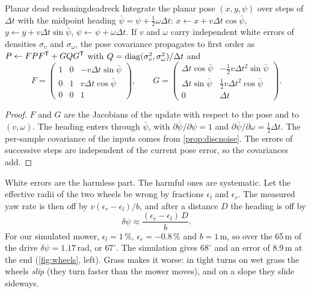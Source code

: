 \begin{proposition}{Planar dead reckoning}{deadreck}
Integrate the planar pose $(x,y,\psi)$ over steps of $\Delta t$ with the
midpoint heading $\bar\psi=\psi+\frac12\omega\Delta t$:
$x\leftarrow x+v\Delta t\cos\bar\psi$, $y\leftarrow y+v\Delta t\sin\bar\psi$,
$\psi\leftarrow\psi+\omega\Delta t$. If $v$ and $\omega$ carry independent
white errors of densities $\sigma_v$ and $\sigma_\omega$, the pose
covariance propagates to first order as $P\leftarrow FPF^{\mathsf{T}}+GQG^{\mathsf{T}}$ with
$Q=\operatorname{diag}(\sigma_v^2,\sigma_\omega^2)/\Delta t$ and
\begin{equation}\label{eq:odocov}
F=\begin{pmatrix}1&0&-v\Delta t\sin\bar\psi\\0&1&v\Delta t\cos\bar\psi\\
0&0&1\end{pmatrix},\qquad
G=\begin{pmatrix}\Delta t\cos\bar\psi&-\frac12v\Delta t^2\sin\bar\psi\\
\Delta t\sin\bar\psi&\frac12v\Delta t^2\cos\bar\psi\\0&\Delta t
\end{pmatrix}.
\end{equation}
\end{proposition}

\begin{proof}
$F$ and $G$ are the Jacobians of the update with respect to the pose and
to $(v,\omega)$. The heading enters through $\bar\psi$, with
$\partial\bar\psi/\partial\psi=1$ and $\partial\bar\psi/\partial\omega=
\frac12\Delta t$. The per-sample covariance of the inputs comes from
\cref{prop:discnoise}. The errors of successive steps are independent of
the current pose error, so the covariances add.
\end{proof}

White errors are the harmless part. The harmful ones are systematic.
Let the effective radii of the two wheels be wrong by fractions
$\epsilon_l$ and $\epsilon_r$. The measured yaw rate is then off by
$v(\epsilon_r-\epsilon_l)/b$, and after a distance $D$ the heading is
off by
\begin{equation}\label{eq:wheelyaw}
\delta\psi\approx\frac{(\epsilon_r-\epsilon_l)\,D}{b}.
\end{equation}
For our simulated mower, $\epsilon_l=1\,\%$, $\epsilon_r=-0.8\,\%$ and
$b=1$\,m, so over the 65\,m of the drive $\delta\psi=1.17$\,rad, or
$67^\circ$. The simulation gives $68^\circ$ and an error of 8.9\,m at
the end (\cref{fig:wheels}, left). Grass makes it worse: in tight turns
on wet grass the wheels \emph{slip} (they turn faster than the mower
moves), and on a slope they slide sideways.


